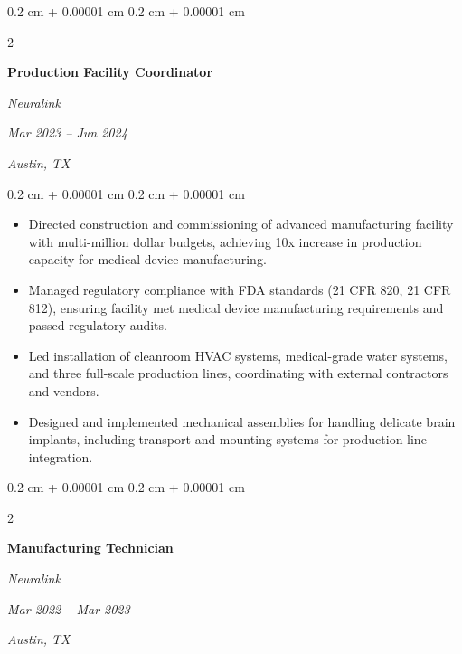 \documentclass[10pt, letterpaper]{article}
\newenvironment{highlights}{
    \begin{itemize}[
        topsep=0.10 cm,
        parsep=0.10 cm,
        partopsep=0pt,
        itemsep=0pt,
        leftmargin=0.4 cm + 10pt
    ]
}{
    \end{itemize}
} %
\newenvironment{onecolentry}{
    \begin{adjustwidth}{
        0.2 cm + 0.00001 cm
    }{
        0.2 cm + 0.00001 cm
    }
}{
    \end{adjustwidth}
} %
\newenvironment{twocolentry}[2][]{
    \onecolentry
    \def\secondColumn{#2}
    \setcolumnwidth{\fill, 5.0 cm}
    \begin{paracol}{2}
}{
    \switchcolumn \raggedleft \secondColumn
    \end{paracol}
    \endonecolentry
} %
\begin{document}
        \vspace{0.35 cm}

        \begin{twocolentry}{
        \textit{Mar 2023 – Jun 2024}
        
        \textit{Austin, TX}}
            \textbf{Production Facility Coordinator}
            
            \textit{Neuralink}
        \end{twocolentry}

        \vspace{0.10 cm}
        \begin{onecolentry}
            \begin{highlights}
                \item Directed construction and commissioning of advanced manufacturing facility with multi-million dollar budgets, achieving 10x increase in production capacity for medical device manufacturing.
                \item Managed regulatory compliance with FDA standards (21 CFR 820, 21 CFR 812), ensuring facility met medical device manufacturing requirements and passed regulatory audits.
                \item Led installation of cleanroom HVAC systems, medical-grade water systems, and three full-scale production lines, coordinating with external contractors and vendors.
                \item Designed and implemented mechanical assemblies for handling delicate brain implants, including transport and mounting systems for production line integration.
            \end{highlights}
        \end{onecolentry}

        \vspace{0.35 cm}

        \begin{twocolentry}{
        \textit{Mar 2022 – Mar 2023}
        
        \textit{Austin, TX}}
            \textbf{Manufacturing Technician}
            
            \textit{Neuralink}
        \end{twocolentry}
\end{document}
